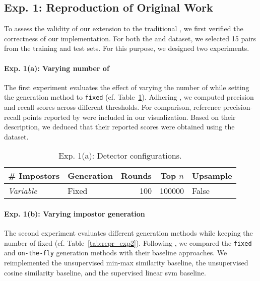 \subsection{Exp. 1: Reproduction of Original Work}

To assess the validity of our extension to the traditional \impAppr{}, we first verified the correctness of our implementation. 
For both the \dataBlog{} and \dataStudent{} dataset, we selected 15 pairs from the training and test sets. 
For this purpose, we designed two experiments.

\paragraph{Exp. 1(a): Varying number of \imps{}}
The first experiment evaluates the effect of varying the number of \imps{} while setting the \imp{} generation method to \texttt{fixed} (cf. Table~\ref{tab:repr_exp1}). 
Adhering \citet{koppel_determining_2014}, we computed precision and recall scores across different thresholds.
For comparison, reference precision-recall points reported by \citet{koppel_determining_2014} were included in our visualization. 
Based on their description, we deduced that their reported scores were obtained using the \dataBlog{} dataset.


\begin{table}[h]
\centering\small
\caption{Exp. 1(a): Detector configurations.}
\label{tab:repr_exp1}
\begin{tabular}{@{}llrrl@{}}   %
\toprule
\# Impostors & Generation & Rounds & Top $n$ & Upsample \\
\midrule
\textit{Variable} & Fixed & 100 & \num{100000} & False \\
\bottomrule
\end{tabular}%
\end{table}



\paragraph{Exp. 1(b): Varying impostor generation}
The second experiment evaluates different \imp{} generation methods while keeping the number of \imps{} fixed (cf. Table~\ref{tab:repr_exp2}). 
Following \citet{koppel_determining_2014}, we compared the \texttt{fixed} and \texttt{on-the-fly} \imp{} generation methods with their baseline approaches. 
We reimplemented the unsupervised min-max similarity baseline, the unsupervised cosine similarity baseline, and the supervised linear \ac{svm} baseline.


